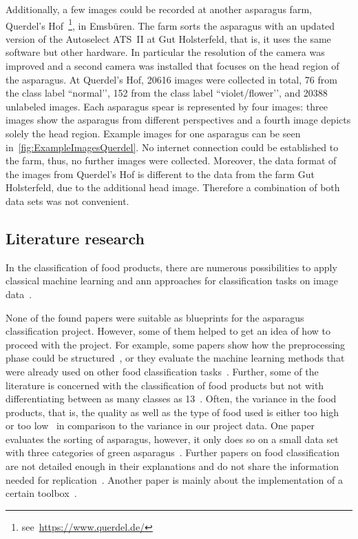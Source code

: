 Additionally, a few images could be recorded at another asparagus farm, Querdel’s Hof~\footnote{see~\url{https://www.querdel.de/}}, in Emsb{\"u}ren. The farm sorts the asparagus with an updated version of the Autoselect ATS~II at Gut Holsterfeld, that is, it uses the same software but other hardware. In particular the resolution of the camera was improved and a second camera was installed that focuses on the head region of the asparagus. At Querdel’s Hof, 20616 images were collected in total, 76 from the class label ``normal’’, 152 from the class label ``violet/flower’’, and 20388 unlabeled images. Each asparagus spear is represented by four images: three images show the asparagus from different perspectives and a fourth image depicts solely the head region. Example images for one asparagus can be seen in~\autoref{fig:ExampleImagesQuerdel}. No internet connection could be established to the farm, thus, no further images were collected. Moreover, the data format of the images from Querdel’s Hof is different to the data from the farm Gut Holsterfeld, due to the additional head image. Therefore a combination of both data sets was not convenient. 


\subsection{Literature research}
\label{sec:Literature}

In the classification of food products, there are numerous possibilities to apply classical machine learning and \acrshort{ann} approaches for classification tasks on image data~\citep{bhargava2018fruits,brosnan2002inspection}.

None of the found papers were suitable as blueprints for the asparagus classification project. However, some of them helped to get an idea of how to proceed with the project. For example, some papers show how the preprocessing phase could be structured~\citep{mery2013automated}, or they evaluate the machine learning methods that were already used on other food classification tasks~\citep{bhargava2018fruits}. Further, some of the literature is concerned with the classification of food products but not with differentiating between as many classes as 13~\citep{diaz2004comparison,kilicc2007classification}. Often, the variance in the food products, that is, the quality as well as the type of food used is either too high~\citep{zhang2012classification} or too low~\citep{kilicc2007classification,al2011dates} in comparison to the variance in our project data.  One paper evaluates the sorting of asparagus, however, it only does so on a small data set with three categories of green asparagus~\citep{donis2016classification}. Further papers on food classification are not detailed enough in their explanations and do not share the information needed for replication~\citep{pedreschi2016grading}. Another paper is mainly about the implementation of a certain toolbox~\citep{mery2013automated}.

